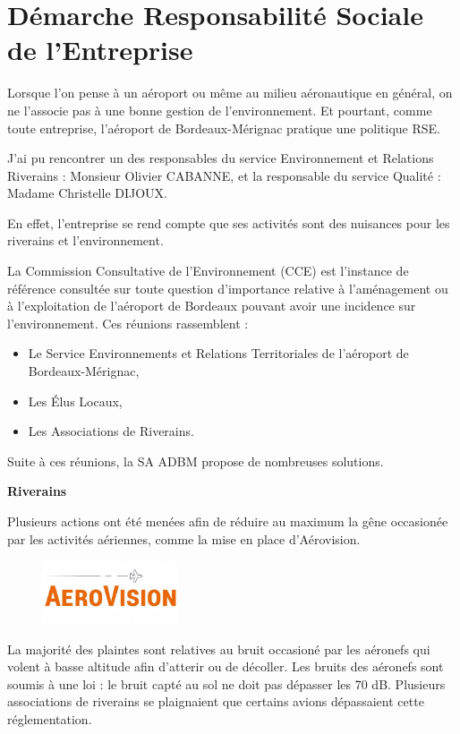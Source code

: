 \section{Démarche Responsabilité Sociale de l’Entreprise}


Lorsque l'on pense à un aéroport ou même au milieu aéronautique en général, on ne l'associe pas à une bonne gestion de l'environnement.
Et pourtant, comme toute entreprise, l'aéroport de Bordeaux-Mérignac pratique une politique RSE.

J'ai pu rencontrer un des responsables du service Environnement et Relations Riverains : Monsieur Olivier CABANNE, et la responsable du service Qualité : Madame Christelle DIJOUX.

En effet, l'entreprise se rend compte que ses activités sont des nuisances pour les riverains et l'environnement. 

La Commission Consultative de l’Environnement (CCE) est l’instance de référence consultée sur toute question d’importance relative à l’aménagement ou à l’exploitation de l’aéroport de Bordeaux pouvant avoir une incidence sur l’environnement. Ces réunions rassemblent : 

\begin{itemize}
  \item Le Service Environnements et Relations Territoriales de l'aéroport de Bordeaux-Mérignac,
  \item Les Élus Locaux,
  \item Les Associations de Riverains.
\end{itemize}

Suite à ces réunions, la SA ADBM propose de nombreuses solutions.\newline

\textbf{Riverains}\newline

Plusieurs actions ont été menées afin de réduire au maximum la gêne occasionée par les activités aériennes, comme la mise en place d'Aérovision.

\begin{figure}[hbt!]
  \centering
  \includegraphics[width=4cm]{Images/logo_aerovision.jpg}
  \label{fig:logoaerovision}
\end{figure}

La majorité des plaintes sont relatives au bruit occasioné par les aéronefs qui volent à basse altitude afin d'atterir ou de décoller.
Les bruits des aéronefs sont soumis à une loi : le bruit capté au sol ne doit pas dépasser les 70 dB. Plusieurs associations de riverains se plaignaient que certains avions dépassaient cette réglementation.\newline

